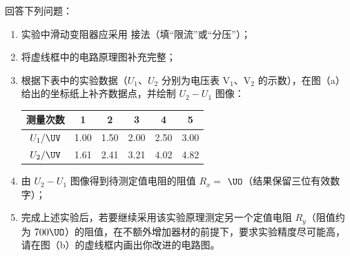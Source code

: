 \documentclass[\gkver]{gaokaozhenti}
\begin{document}
\begin{enumerate}
回答下列问题：
\begin{enumerate}
	\item
	实验中滑动变阻器应采用  接法（填“限流”或“分压”）；
	\item
	将虚线框中的电路原理图补充完整；
	\item
	根据下表中的实验数据（$U_{1}$、$U_{2}$ 分别为电压表 V$_{1}$、V$_{2}$ 的示数），在图（a）给出的坐标纸上补齐数据点，并绘制 $U_{2}-U_{1}$ 图像：

	\begin{center}
	\begin{tabular}{|c|c|c|c|c|c|}
	\hline
	测量次数 & 1 & 2 & 3 & 4 & 5 \\
	\hline
	$U_{1}/\UV$ & 1.00 & 1.50 & 2.00 & 2.50 & 3.00 \\
	\hline
	$U_{2}/\UV$ & 1.61 & 2.41 & 3.21 & 4.02 & 4.82 \\
	\hline
	\end{tabular}
	\end{center}
	\item
	由 $U_{2}-U_{1}$ 图像得到待测定值电阻的阻值 $R_{x}=$  $\UO$（结果保留三位有效数字）；
	\item
	完成上述实验后，若要继续采用该实验原理测定另一个定值电阻 $R_{y}$（阻值约为 $700\UO$）的阻值，在不额外增加器材的前提下，要求实验精度尽可能高，请在图（b）的虚线框内画出你改进的电路图。
\end{enumerate}

\end{enumerate}
\end{document}
